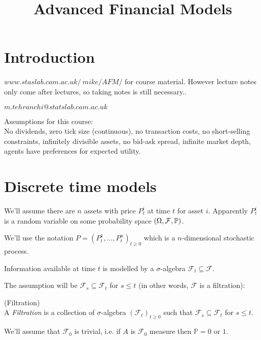\documentclass[a4paper]{article}
\begin{document}
\title{Advanced Financial Models}

\maketitle

\newpage

\tableofcontents

\newpage

\section{Introduction}

$www.staslab.cam.ac.uk/~mike/AFM/$ for course material. However lecture notes only come after lectures, so taking notes is still necessary..

$m.tehranchi@statslab.cam.ac.uk$

Assumptions for this course:\\
No dividends, zero tick size (continuous), no transaction costs, no short-selling constraints, infinitely divisible assets, no bid-ask spread, infinite market depth, agents have preferences for expected utility.

\newpage

\section{Discrete time models}

We'll assume there are $n$ assets with price $P_t^i$ at time $t$ for asset $i$. Apparently $P_t^i$ is a random variable on some probability space $(\Omega,\mathcal{F},\P)$.

We'll use the notation $P=(P_t^1,...,P_t^n)_{t \geq 0}$ which is a $n$-dimensional stochastic process.

Information available at time $t$ is modelled by a $\sigma$-algebra $\mathcal{F}_t \subseteq \mathcal{F}$.

The assumption will be $\mathcal{F}_s \subseteq \mathcal{F}_t$ for $s \leq t$ (in other words, $\mathcal{F}$ is a filtration):

\begin{defi} (Filtration)\\
A \emph{Filtration} is a collection of $\sigma$-algebra $(\mathcal{F}_t)_{t \geq 0}$ such that $\mathcal{F}_s \subseteq \mathcal{F}_t$ for $s \leq t$.
\end{defi}

We'll assume that $\mathcal{F}_0$ is trivial, i.e. if $A$ is $\mathcal{F}_0$ measure then $\mathbb{P} = 0$ or $1$.
\end{document}
